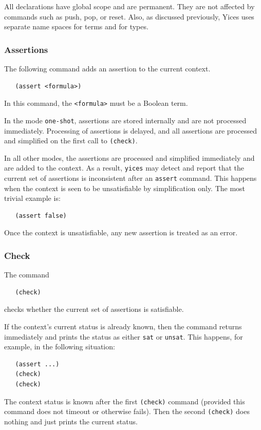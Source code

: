 \documentclass[11pt,twoside,fleqn,openright,titlepage]{cslreport}
\begin{document}
\medskip\noindent
All declarations have global scope and are permanent. They are not
affected by commands such as push, pop, or reset. Also, as discussed
previously, Yices uses separate name spaces for terms and for types.



\subsubsection*{Assertions}

The following command adds an assertion to the current context.
\begin{small}
\begin{verbatim}
   (assert <formula>)
\end{verbatim}
\end{small}
In this command, the \texttt{<formula>} must be a Boolean term.

\medskip\noindent
In the mode \texttt{one-shot}, assertions are stored internally and
are not processed immediately. Processing of assertions is delayed,
and all assertions are processed and simplified on the first call to
\texttt{(check)}.

\medskip\noindent
In all other modes, the assertions are processed and simplified
immediately and are added to the context. As a result, \texttt{yices}
may detect and report that the current set of assertions is
inconsistent after an \texttt{assert} command. This happens when the
context is seen to be unsatisfiable by simplification only. The most
trivial example is:
\begin{small}
\begin{verbatim}
   (assert false)
\end{verbatim}
\end{small}
Once the context is unsatisfiable, any new assertion is treated as an
error.


\subsubsection*{Check}

The command
\begin{small}
\begin{verbatim}
   (check)
\end{verbatim}
\end{small}
checks whether the current set of assertions is satisfiable.

\medskip\noindent
If the context's current status is already known, then the command
returns immediately and prints the status as either \texttt{sat} or
\texttt{unsat}. This happens, for example, in the following situation:
\begin{small}
\begin{verbatim}
   (assert ...)
   (check)
   (check)
\end{verbatim}
\end{small}
The context status is known after the first \texttt{(check)} command
(provided this command does not timeout or otherwise fails). Then the
second \texttt{(check)} does nothing and just prints the current
status.
\end{document}
